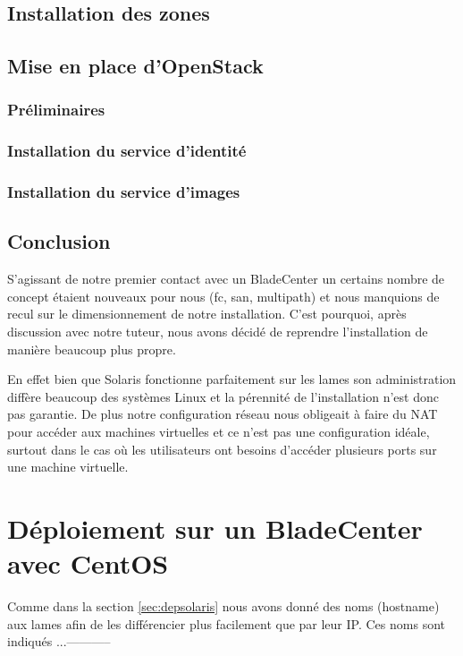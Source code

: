 \documentclass[a4paper,oneside]{report}
\begin{document}
\subsection{Installation des zones}

\subsection{Mise en place d'OpenStack}
\subsubsection{Préliminaires}

\subsubsection{Installation du service d'identité}

\subsubsection{Installation du service d'images}

\subsection{Conclusion}
S'agissant de notre premier contact avec un BladeCenter un certains nombre de concept étaient nouveaux pour nous (\gls{fc}, \gls{san}, multipath) et nous manquions de recul sur le dimensionnement de notre installation.
C'est pourquoi, après discussion avec notre tuteur, nous avons décidé de reprendre l'installation de manière beaucoup plus propre.

En effet bien que Solaris fonctionne parfaitement sur les lames son administration diffère beaucoup des systèmes Linux et la pérennité de l'installation n'est donc pas garantie.\newline
De plus notre configuration réseau nous obligeait à faire du NAT pour accéder aux machines virtuelles et ce n'est pas une configuration idéale, surtout dans le cas où les utilisateurs ont besoins d'accéder plusieurs ports sur une machine virtuelle.


\section{Déploiement sur un BladeCenter avec CentOS}
Comme dans la section \ref{sec:depsolaris} nous avons donné des noms (hostname) aux lames afin de les différencier plus facilement que par leur IP.
Ces noms sont indiqués ...-----------
\end{document}
